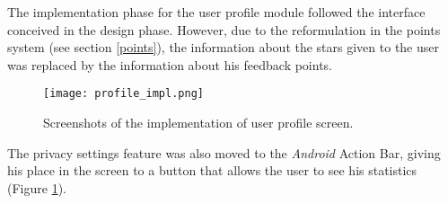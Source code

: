 The implementation phase for the user profile module followed the interface conceived in the design phase. However, due to the reformulation in the points system (see section \ref{points}), the information about the stars given to the user was replaced by the information about his feedback points.

\begin{figure}[h!]
  \begin{center}
    \leavevmode
    \texttt{[image: profile\_impl.png]}
    \caption{Screenshots of the implementation of user profile screen.}
    \label{fig:profile_impl}
  \end{center}
\end{figure}

The privacy settings feature was also moved to the \emph{Android} Action Bar, giving his place in the screen to a button that allows the user to see his statistics (Figure \ref{fig:profile_impl}).

